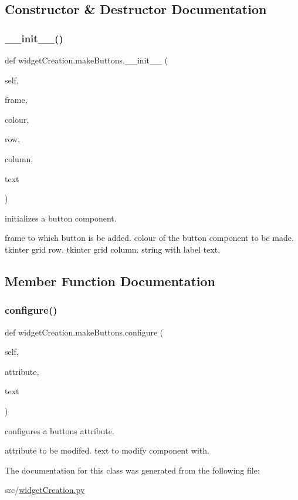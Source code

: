 \subsection{Constructor \& Destructor Documentation}
\mbox{\label{classwidget_creation_1_1make_buttons_ad1061e56880f1434230600c2d7879482}} 
\subsubsection{\texorpdfstring{\+\_\+\+\_\+init\+\_\+\+\_\+()}{\_\_init\_\_()}}
{\footnotesize\ttfamily def widget\+Creation.\+make\+Buttons.\+\_\+\+\_\+init\+\_\+\+\_\+ (\begin{DoxyParamCaption}\item[{}]{self,  }\item[{}]{frame,  }\item[{}]{colour,  }\item[{}]{row,  }\item[{}]{column,  }\item[{}]{text }\end{DoxyParamCaption})}



initializes a button component. 

frame to which button is be added.  colour of the button component to be made.  tkinter grid row.  tkinter grid column.  string with label text. 

\subsection{Member Function Documentation}
\mbox{\label{classwidget_creation_1_1make_buttons_a46d1df511c7c60d021bb21f74cad8371}} 
\subsubsection{\texorpdfstring{configure()}{configure()}}
{\footnotesize\ttfamily def widget\+Creation.\+make\+Buttons.\+configure (\begin{DoxyParamCaption}\item[{}]{self,  }\item[{}]{attribute,  }\item[{}]{text }\end{DoxyParamCaption})}



configures a buttons attribute. 

attribute to be modifed.  text to modify component with. 

The documentation for this class was generated from the following file\+:\begin{DoxyCompactItemize}
\item 
src/\hyperlink{widget_creation_8py}{widget\+Creation.\+py}\end{DoxyCompactItemize}
